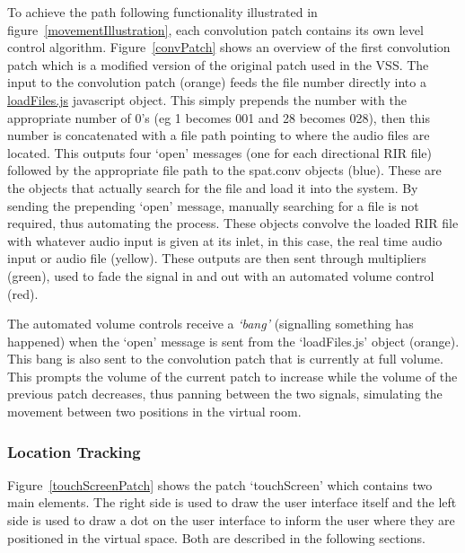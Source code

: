 \documentclass[../../main.tex]{subfiles}
\begin{document}
			To achieve the path following functionality illustrated in figure~\ref{movementIllustration}, each convolution patch contains its own level control algorithm. Figure~\ref{convPatch} shows an overview of the first convolution patch which is a modified version of the original patch used in the \ac{VSS}. The input to the convolution patch (orange) feeds the file number directly into a \href{http://lt669.github.io/code/javascript/html/loadFiles.html}{loadFiles.js} javascript object. This simply prepends the number with the appropriate number of 0's (eg 1 becomes 001 and 28 becomes 028), then this number is concatenated with a file path pointing to where the audio files are located. This outputs four `open' messages (one for each directional \ac{RIR} file) followed by the appropriate file path to the spat.conv objects (blue). These are the objects that actually search for the file and load it into the system. By sending the prepending `open' message, manually searching for a file is not required, thus automating the process. These objects convolve the loaded \ac{RIR} file with whatever audio input is given at its inlet, in this case, the real time audio input or audio file (yellow). These outputs are then sent through multipliers (green), used to fade the signal in and out with an automated volume control (red).
		 	
		 	The automated volume controls receive a \textit{`bang'} (signalling something has happened) when the `open' message is sent from the `loadFiles.js' object (orange). This bang is also sent to the convolution patch that is currently at full volume. This prompts the volume of the current patch to increase while the volume of the previous patch decreases, thus panning between the two signals, simulating the movement between two positions in the virtual room.


	\subsubsection{Location Tracking}
	\label{locationtracking}
	Figure~\ref{touchScreenPatch} shows the patch `touchScreen' which contains two main elements. The right side is used to draw the user interface itself and the left side is used to draw a dot on the user interface to inform the user where they are positioned in the virtual space. Both are described in the following sections.
\end{document}
